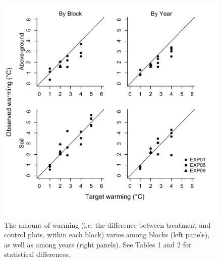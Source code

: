 \documentclass{article}
\begin{document}
 \begin{figure}[p]
     \centering
 \includegraphics{../figures/BothWarmingbyblockyear.pdf}    
 \caption{The amount of warming (i.e. the difference between treatment and control plots, within each block) varies among blocks (left panels), as well as among years (right panels). See Tables 1 and 2 for statistical differences.} %
 \end{figure}
\clearpage
\end{document}

